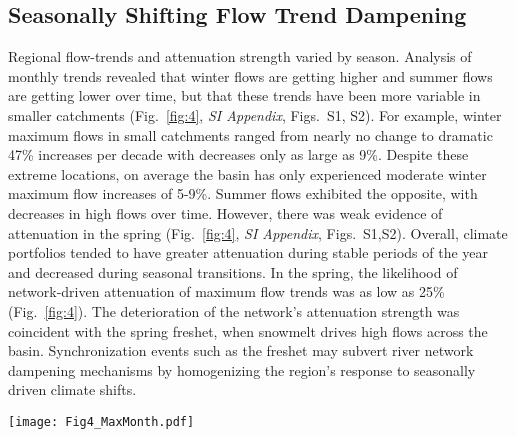 \documentclass[9pt,twocolumn,twoside,lineno]{pnas-new}
\begin{document}
\subsection*{Seasonally Shifting Flow Trend Dampening} Regional flow-trends and attenuation strength varied by season. Analysis of monthly trends revealed that winter flows are getting higher and summer flows are getting lower over time, but that these trends have been more variable in smaller catchments (Fig.~\ref{fig:4}, \textit{SI Appendix}, Figs.~S1, S2). For example, winter maximum flows in small catchments ranged from nearly no change to dramatic 47\% increases per decade with decreases only as large as 9\%. Despite these extreme locations, on average the basin has only experienced moderate winter maximum flow increases of 5-9\%. Summer flows exhibited the opposite, with decreases in high flows over time. However, there was weak evidence of attenuation in the spring (Fig.~\ref{fig:4}, \textit{SI Appendix}, Figs.~S1,S2). Overall, climate portfolios tended to have greater attenuation during stable periods of the year and decreased during seasonal transitions. In the spring, the likelihood of network-driven attenuation of maximum flow trends was as low as 25\% (Fig.~\ref{fig:4}). The deterioration of the network's attenuation strength was coincident with the spring freshet, when snowmelt drives high flows across the basin. Synchronization events such as the freshet may subvert river network dampening mechanisms by homogenizing the region's response to seasonally driven climate shifts.
 
\begin{SCfigure*}[\sidecaptionrelwidth][h]
\centering
\texttt{[image: Fig4\_MaxMonth.pdf]}
	\caption{Monthly maximum flow trend attenuation within the Fraser River basin. (\textbf{Left}) Fraser River's basin-wide maximum-flow trend estimates (i.e., intercept = vertical grey lines) by month with density distributions of null-model simulations. Observed values falling further from the center of the density distribution suggest greater evidence for changes in maximum flow and a greater shift in magnitude. (\textbf{Center}) Observed monthly Fraser River maximum-flow variance exponent ($\hat{\updelta}$, blue) and associated density distribution of simulated $\hat{\updelta}$ estimates. Decimal values represent the percent of simulated data exhibiting weaker attenuation (yellow) than observed. (\textbf{Right}) Trend estimates $\pm$ one standard error (SE, grey) plotted against watershed area (km\textsuperscript{2}), colored by climate portfolio strength (green = small, blue = large), for four seasonally representative months. These reflect months in the prior columns and describe the variation in percent change per decade of maximum flow among sites. Simulated lines ignore variance in the intercept and slope to focus visually on attenuation.}
\label{fig:4}
\end{SCfigure*}
\end{document}

